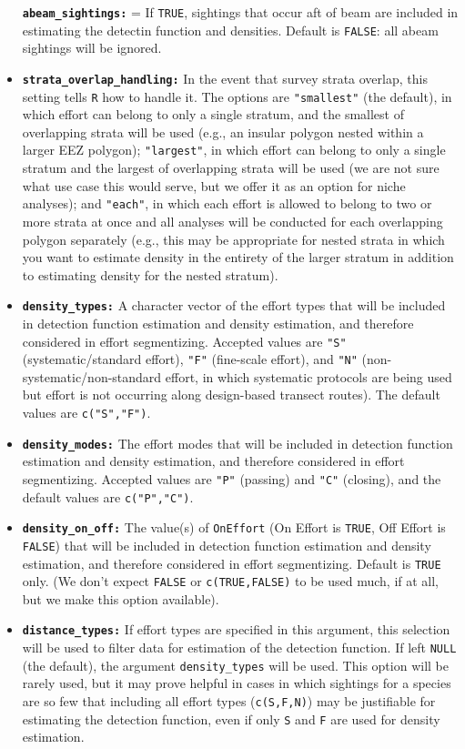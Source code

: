 \documentclass[
]{book}
\begin{document}
\begin{itemize}
  \textbf{\texttt{abeam\_sightings:}} = If \texttt{TRUE}, sightings that occur aft of beam are included in estimating the detectin function and densities. Default is \texttt{FALSE}: all abeam sightings will be ignored.
\item
  \textbf{\texttt{strata\_overlap\_handling:}} In the event that survey strata overlap, this setting tells \texttt{R} how to handle it. The options are \texttt{"smallest"} (the default), in which effort can belong to only a single stratum, and the smallest of overlapping strata will be used (e.g., an insular polygon nested within a larger EEZ polygon); \texttt{"largest"}, in which effort can belong to only a single stratum and the largest of overlapping strata will be used (we are not sure what use case this would serve, but we offer it as an option for niche analyses); and \texttt{"each"}, in which each effort is allowed to belong to two or more strata at once and all analyses will be conducted for each overlapping polygon separately (e.g., this may be appropriate for nested strata in which you want to estimate density in the entirety of the larger stratum in addition to estimating density for the nested stratum).
\item
  \textbf{\texttt{density\_types:}} A character vector of the effort types that will be included in detection function estimation and density estimation, and therefore considered in effort segmentizing. Accepted values are \texttt{"S"} (systematic/standard effort), \texttt{"F"} (fine-scale effort), and \texttt{"N"} (non-systematic/non-standard effort, in which systematic protocols are being used but effort is not occurring along design-based transect routes). The default values are \texttt{c("S","F")}.
\item
  \textbf{\texttt{density\_modes:}} The effort modes that will be included in detection function estimation and density estimation, and therefore considered in effort segmentizing. Accepted values are \texttt{"P"} (passing) and \texttt{"C"} (closing), and the default values are \texttt{c("P","C")}.
\item
  \textbf{\texttt{density\_on\_off:}} The value(s) of \texttt{OnEffort} (On Effort is \texttt{TRUE}, Off Effort is \texttt{FALSE}) that will be included in detection function estimation and density estimation, and therefore considered in effort segmentizing. Default is \texttt{TRUE} only. (We don't expect \texttt{FALSE} or \texttt{c(TRUE,FALSE)} to be used much, if at all, but we make this option available).
\item
  \textbf{\texttt{distance\_types:}} If effort types are specified in this argument, this selection will be used to filter data for estimation of the detection function. If left \texttt{NULL} (the default), the argument \texttt{density\_types} will be used. This option will be rarely used, but it may prove helpful in cases in which sightings for a species are so few that including all effort types (\texttt{c(\textquotesingle{}S\textquotesingle{},\textquotesingle{}F\textquotesingle{},\textquotesingle{}N\textquotesingle{})}) may be justifiable for estimating the detection function, even if only \texttt{\textquotesingle{}S\textquotesingle{}} and \texttt{\textquotesingle{}F\textquotesingle{}} are used for density estimation.

\end{itemize}
\end{document}
